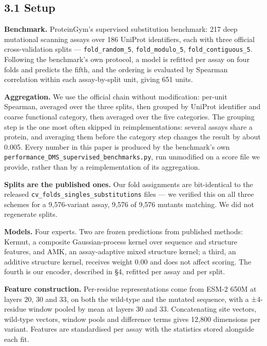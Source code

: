 \hypertarget{setup}{%
\subsection{3.1 Setup}\label{setup}}

\textbf{Benchmark.} ProteinGym's supervised substitution benchmark: 217 deep mutational scanning assays over
186 UniProt identifiers, each with three official cross-validation splits --- \texttt{fold\_random\_5},
\texttt{fold\_modulo\_5}, \texttt{fold\_contiguous\_5}. Following the benchmark's own protocol, a model is refitted per
assay on four folds and predicts the fifth, and the ordering is evaluated by Spearman correlation
within each assay-by-split unit, giving 651 units.

\textbf{Aggregation.} We use the official chain without modification: per-unit Spearman, averaged over the
three splits, then grouped by UniProt identifier and coarse functional category, then averaged over the
five categories. The grouping step is the one most often skipped in reimplementations: several assays
share a protein, and averaging them before the category step changes the result by about 0.005. Every
number in this paper is produced by the benchmark's own
\texttt{performance\_DMS\_supervised\_benchmarks.py}, run unmodified on a score file we provide, rather than by a
reimplementation of its aggregation.

\textbf{Splits are the published ones.} Our fold assignments are bit-identical to the released
\texttt{cv\_folds\_singles\_substitutions} files --- we verified this on all three schemes for a 9,576-variant
assay, 9,576 of 9,576 mutants matching. We did not regenerate splits.

\textbf{Models.} Four experts. Two are frozen predictions from published methods: Kermut, a composite
Gaussian-process kernel over sequence and structure features, and AMK, an assay-adaptive mixed structure
kernel; a third, an additive structure kernel, receives weight 0.00 and does not affect scoring. The
fourth is our encoder, described in §4, refitted per assay and per split.

\textbf{Feature construction.} Per-residue representations come from ESM-2 650M at layers 20, 30 and 33, on
both the wild-type and the mutated sequence, with a ±4-residue window pooled by mean at layers 30 and
33. Concatenating site vectors, wild-type vectors, window pools and difference terms gives 12,800
dimensions per variant. Features are standardised per assay with the statistics stored alongside each
fit.

